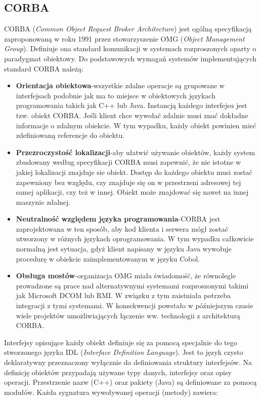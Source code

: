 \subsection{CORBA}
CORBA (\textit{Common Object Request Broker Architecture}) jest ogólną specyfikacją zaproponowaną w roku 1991 przez stowarzyszenie OMG (\textit{Object Management Group}). Definiuje ona standard komunikacji w systemach rozproszonych oparty o paradygmat obiektowy. Do podstawowych wymagań\cite{bolton2002pure} systemów implementujących standard CORBA należą:
\begin{itemize}
	\item \textbf{Orientacja obiektowa}-wszystkie zdalne operacje są grupowane w interfejsach podobnie jak ma to miejsce w obiektowych językach programowania takich jak C++ lub Java. Instancją każdego interfejsu jest tzw. obiekt CORBA. Jeśli klient chce wywołać zdalnie musi znać dokładne informacje o zdalnym obiekcie. W tym wypadku, każdy obiekt powinien mieć zdefiniowaną referencje do obiektu.
	\item \textbf{Przezroczystość lokalizacji}-aby ułatwić używanie obiektów, każdy system zbudowany według specyfikacji CORBA musi zapewnić, że nie istotne w jakiej lokalizacji znajduje sie obiekt. Dostęp do każdego obiektu musi zostać zapewniony bez względu, czy znajduje się on w przestrzeni adresowej tej samej aplikacji, czy też w innej. Obiekt może znajdować się nawet na innej maszynie zdalnej.
	\item \textbf{Neutralność względem języka programowania}-CORBA jest zaprojektowana w ten sposób, aby kod klienta i serwera mógł zostać utworzony w różnych językach oprogramowania. W tym wypadku całkowicie normalną jest sytuacja, gdyż klient napisany w języku Java wywołuje procedurę w obiekcie zaimplementowanym w języku Cobol.
	\item \textbf{Obsługa mostów}-organizacja OMG miała świadomość, że równolegle prowadzone są prace nad alternatywnymi systemami rozproszonymi takimi jak Microsoft DCOM lub RMI. W związku z tym zaistniała potrzeba integracji z tymi systemami. W konsekwencji powstało w późniejszym czasie wiele projektów umożliwiających łączenie ww. technologii z architekturą CORBA.
\end{itemize}
Interfejsy opisujące każdy obiekt definiuje się za pomocą specjalnie do tego stworzonego języka IDL (\textit{Interface Definition Language}). Jest to język czysto deklaratywny przeznaczony wyłącznie do definiowania struktury interfejsów. Na definicję obiektów przypadają używane typy danych, interfejsy oraz opisy operacji. Przestrzenie nazw (C++) oraz pakiety (Java) są definiowane za pomocą modułów. Każda sygnatura wywoływanej operacji (metody) zawiera:
